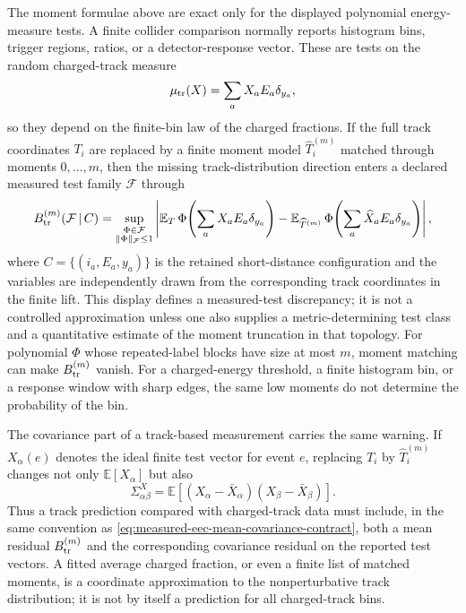 \begin{remark}
\label{rem:track-function-measured-test-warning}
The moment formulae above are exact only for the displayed polynomial
energy-measure tests.  A finite collider comparison normally reports
histogram bins, trigger regions, ratios, or a detector-response vector.  These
are tests on the random charged-track measure
\[
  \mu_{\rm tr}(X)=\sum_a X_aE_a\delta_{y_a},
\]
so they depend on the finite-bin law of the charged fractions.  If the full
track coordinates \(T_i\) are replaced by a finite moment model
\(\widehat T_i^{(m)}\) matched through moments \(0,\ldots,m\), then the
missing track-distribution direction enters a declared measured test family
\(\mathcal F\) through
\begin{equation}
  B_{\rm tr}^{(m)}(\mathcal F\,|\,C)
  =
  \sup_{\substack{\Phi\in\mathcal F\\ \|\Phi\|_{\mathcal F}\le1}}
  \left|
    \mathbb E_{T}\,
    \Phi\!\left(\sum_a X_aE_a\delta_{y_a}\right)
    -
    \mathbb E_{\widehat T^{(m)}}\,
    \Phi\!\left(\sum_a \widehat X_aE_a\delta_{y_a}\right)
  \right| ,
  \label{eq:track-function-measured-test-budget}
\end{equation}
where \(C=\{(i_a,E_a,y_a)\}\) is the retained short-distance configuration
and the variables are independently drawn from the corresponding track
coordinates in the finite lift.  This display defines a measured-test
discrepancy; it is not a controlled approximation unless one also supplies a
metric-determining test class and a quantitative estimate of the moment
truncation in that topology.  For polynomial \(\Phi\) whose repeated-label
blocks have size at most \(m\), moment matching can make
\(B_{\rm tr}^{(m)}\) vanish.  For a charged-energy threshold, a finite
histogram bin, or a response window with sharp edges, the same low moments do
not determine the probability of the bin.

The covariance part of a track-based measurement carries the same warning.  If
\(X_\alpha(e)\) denotes the ideal finite test vector for event \(e\), replacing
\(T_i\) by \(\widehat T_i^{(m)}\) changes not only \(\mathbb E[X_\alpha]\) but
also
\[
  \Sigma^X_{\alpha\beta}
  =
  \mathbb E[(X_\alpha-\bar X_\alpha)(X_\beta-\bar X_\beta)] .
\]
Thus a track prediction compared with charged-track data must include, in the
same convention as \eqref{eq:measured-eec-mean-covariance-contract}, both a
mean residual \(B_{\rm tr}^{(m)}\) and the corresponding covariance residual
on the reported test vectors.  A fitted average charged fraction, or even a
finite list of matched moments, is a coordinate approximation to the
nonperturbative track distribution; it is not by itself a prediction for all
charged-track bins.
\end{remark}

